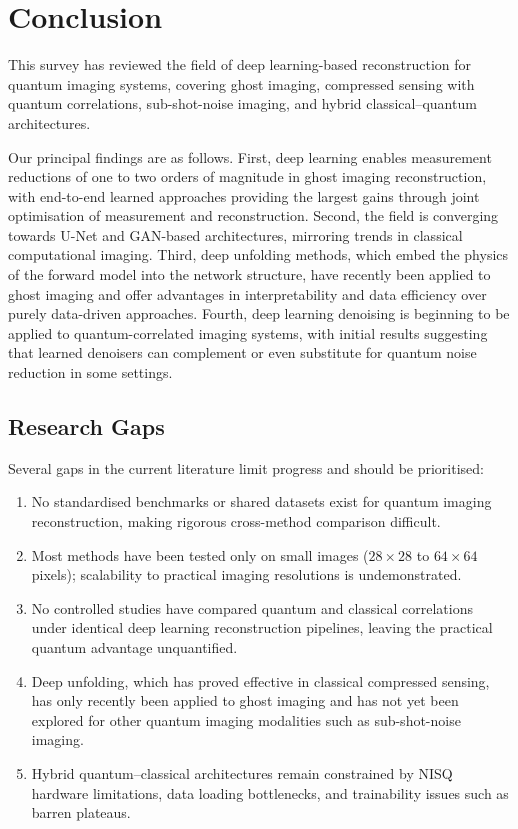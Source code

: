 \section{Conclusion}
\label{sec:conclusion}

This survey has reviewed the field of deep learning-based reconstruction for quantum imaging systems, covering ghost imaging, compressed sensing with quantum correlations, sub-shot-noise imaging, and hybrid classical--quantum architectures.

Our principal findings are as follows. First, deep learning enables measurement reductions of one to two orders of magnitude in ghost imaging reconstruction, with end-to-end learned approaches providing the largest gains through joint optimisation of measurement and reconstruction. Second, the field is converging towards U-Net and GAN-based architectures, mirroring trends in classical computational imaging. Third, deep unfolding methods, which embed the physics of the forward model into the network structure, have recently been applied to ghost imaging and offer advantages in interpretability and data efficiency over purely data-driven approaches. Fourth, deep learning denoising is beginning to be applied to quantum-correlated imaging systems, with initial results suggesting that learned denoisers can complement or even substitute for quantum noise reduction in some settings.

\subsection*{Research Gaps}

Several gaps in the current literature limit progress and should be prioritised:
\begin{enumerate}[label=(\roman*)]
    \item No standardised benchmarks or shared datasets exist for quantum imaging reconstruction, making rigorous cross-method comparison difficult.
    \item Most methods have been tested only on small images ($28 \times 28$ to $64 \times 64$ pixels); scalability to practical imaging resolutions is undemonstrated.
    \item No controlled studies have compared quantum and classical correlations under identical deep learning reconstruction pipelines, leaving the practical quantum advantage unquantified.
    \item Deep unfolding, which has proved effective in classical compressed sensing, has only recently been applied to ghost imaging and has not yet been explored for other quantum imaging modalities such as sub-shot-noise imaging.
    \item Hybrid quantum--classical architectures remain constrained by NISQ hardware limitations, data loading bottlenecks, and trainability issues such as barren plateaus.
\end{enumerate}

